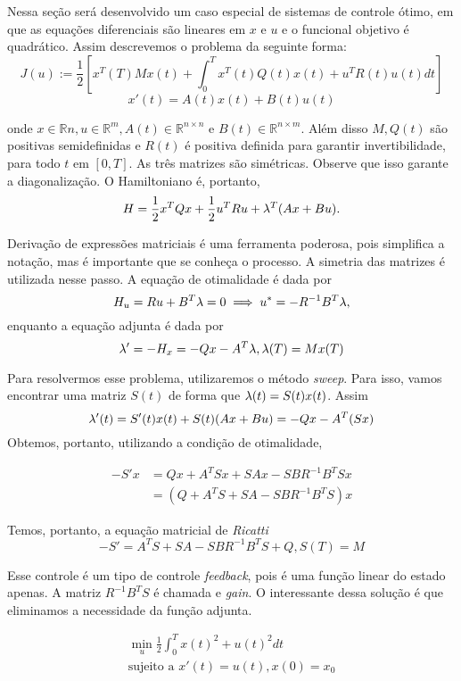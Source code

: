 Nessa seção será desenvolvido um caso especial de sistemas de controle ótimo,
em que as equações diferenciais são lineares em $x$ e $u$ e o funcional
objetivo é quadrático. Assim descrevemos o problema da seguinte forma: 
$$
J(u) := \frac{1}{2}[x^T(T)Mx(t) + \int_0^T x^T(t)Q(t)x(t) + u^TR(t)u(t) dt]
$$
$$
x'(t) = A(t)x(t) + B(t)u(t)
$$

onde $x \in \mathbb{R}n, u \in \mathbb{R}^m, A(t) \in \mathbb{R}^{n \times n}$
e $B(t) \in \mathbb{R}^{n\times m}$. Além disso $M, Q(t)$ são positivas
semidefinidas e $R(t)$ é positiva definida para garantir invertibilidade, para
todo $t$ em $[0,T]$. As três matrizes são simétricas. Observe que isso garante a
diagonalização. O Hamiltoniano é, portanto, 
$$H = \frac{1}{2}x^TQx + \frac{1}{2}u^TRu + \lambda^T(Ax + Bu).$$

Derivação de expressões matriciais é uma ferramenta poderosa, pois simplifica
a notação, mas é importante que se conheça o processo. A simetria das matrizes
é utilizada nesse passo. A equação de otimalidade é dada por 
$$
H_u = Ru + B^T\lambda = 0 \implies u^* = - R^{-1}B^T\lambda,
$$
enquanto a equação adjunta é dada por 
$$
\lambda' = -H_x = -Qx - A^T\lambda, \lambda(T) = Mx(T)
$$

Para resolvermos esse problema, utilizaremos o método \textit{sweep}. Para
isso, vamos encontrar uma matriz $S(t)$ de forma que $\lambda(t) = S(t)x(t)$.
Assim 
$$
\lambda '(t) = S'(t)x(t) + S(t)(Ax + Bu) = -Qx -A^T(Sx)
$$
Obtemos, portanto, utilizando a condição de otimalidade, 

\begin{equation*}
    \begin{split}
        -S'x &= Qx + A^TSx + SAx - SBR^{-1}B^TSx \\
        &= (Q + A^TS + SA - SBR^{-1}B^TS)x
    \end{split}
\end{equation*}

Temos, portanto, a equação matricial de \textit{Ricatti}
$$
-S' = A^TS + SA - SBR^{-1}B^TS + Q, S(T) = M
$$

Esse controle é um tipo de controle \textit{feedback}, pois é uma função
linear do estado apenas. A matriz $R^{-1}B^TS$ é chamada e \textit{gain}. O
interessante dessa solução é que eliminamos a necessidade da função adjunta. 

\begin{example}
    \begin{gather*}
        \min_u \frac{1}{2}\int_0^T x(t)^2 + u(t)^2 dt \\
        \text{sujeito a  }x'(t) = u(t), x(0) = x_0
    \end{gather*}
\end{example}

